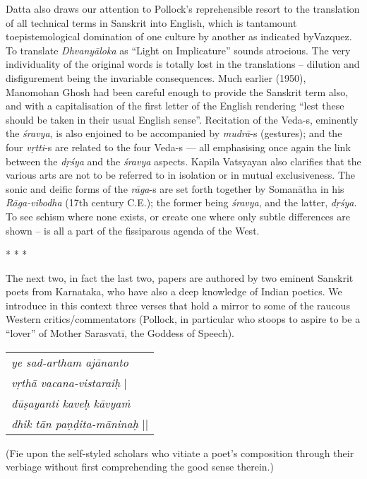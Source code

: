 Datta also draws our attention to Pollock’s reprehensible resort to the translation of all technical terms in Sanskrit into English, which is tantamount to\break epistemological domination of one culture by another as indicated by\break Vazquez. To translate \textsl{Dhvanyāloka} as “Light on Implicature” sounds atrocious. The very individuality of the original words is totally lost in the translations -- dilution and disfigurement being the invariable consequences. Much earlier (1950), Manomohan Ghosh had been careful enough to provide the Sanskrit term also, and with a capitalisation of the first letter of the English rendering “lest these should be taken in their usual English sense”. Recitation of the \hbox{Veda-s}, eminently the \textsl{śravya}, is also enjoined to be accompanied by \hbox{\textsl{mudrā}-s} (gestures); and the four \textsl{vṛtti}-s are related to the four Veda-s --- all emphasising once again the link between the \textsl{dṛśya} and the \textsl{śravya} aspects. Kapila Vatsyayan also clarifies that the various arts are not to be referred to in isolation or in mutual exclusiveness. The sonic and deific forms of the \textsl{rāga}-s are set forth together by Somanātha in his \textsl{Rāga-vibodha} (17th century C.E.); the former being \textsl{śravya}, and the latter, \textsl{dṛśya}. To see schism where none exists, or create one where only subtle differences are shown -- is all a part of the fissiparous agenda of the West.
\begin{center}
* * *
\end{center}
The next two, in fact the last two, papers are authored by two eminent Sanskrit poets from Karnataka, who have also a deep knowledge of Indian poetics. We introduce in this context three verses that hold a mirror to some of the raucous Western critics/commentators (Pollock, in particular who stoops to aspire to be a ``lover'' of Mother Sarasvatī, the Goddess of Speech).
\begin{center}
\begin{tabular}{l}
\textsl{ye sad-artham ajānanto}\\
\phantom{aaaaaa}\textsl{vṛthā vacana-vistaraiḥ} |\\
\textsl{dūṣayanti kaveḥ kāvyaṁ}\\
\phantom{aaaaaa}\textsl{dhik tān paṇḍita-māninaḥ} ||
\end{tabular}
\end{center}
(Fie upon the self-styled scholars who vitiate a poet's composition through their verbiage without first comprehending the good sense therein.)

